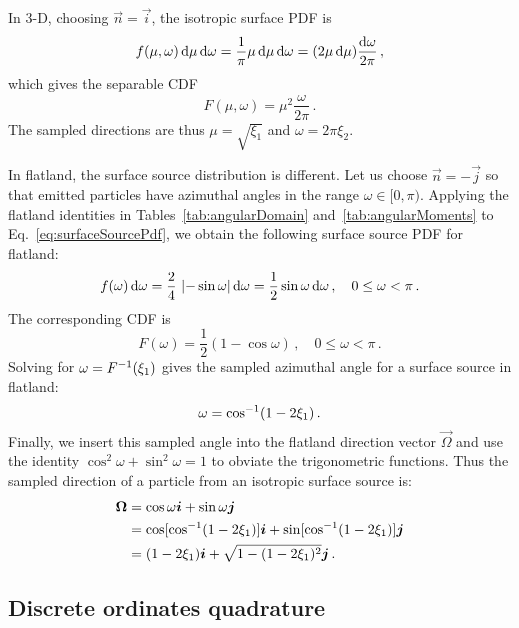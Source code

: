 In 3-D, choosing $\vec{n}=\vec{i}$, the isotropic surface PDF is
\begin{equation*}
  f(\mu,\omega) \mathop{}\!\mathrm{d}\mu \mathop{}\!\mathrm{d}\omega
  = \frac{1}{\pi} \mu \mathop{}\!\mathrm{d}\mu \mathop{}\!\mathrm{d}\omega
  = (2 \mu \mathop{}\!\mathrm{d}\mu) \frac{\mathop{}\!\mathrm{d}\omega}{2\pi}\,,
\end{equation*}
which gives the separable CDF
\begin{equation*}
  F(\mu,\omega) = \mu^2 \frac{\omega}{2\pi}\,.
\end{equation*}
The sampled directions are thus $\mu=\sqrt{\xi_1}$ and $\omega=2\pi \xi_2$.

In flatland, the surface source distribution is different. Let us choose
$\vec{n} = -\vec{j}$ so that emitted particles have azimuthal angles in the range
$\omega \in [0, \pi)$.
Applying the flatland identities in Tables~\ref{tab:angularDomain}
and~\ref{tab:angularMoments} to Eq.~\eqref{eq:surfaceSourcePdf}, we obtain
the following surface source PDF for flatland:
\begin{equation*}
  f(\omega) \mathop{}\!\mathrm{d}\omega = \frac{2}{4} \, \left|  -\sin \omega \right|\mathop{}\!\mathrm{d}\omega
  = \frac{1}{2} \sin \omega\mathop{}\!\mathrm{d}\omega \,,\quad 0 \le \omega < \pi\,.
\end{equation*}
The corresponding CDF is
\begin{equation}\label{eq:surfaceSourceFlatland}
  F(\omega) = \frac{1}{2} \left( 1-\cos\omega \right)
  \,,\quad 0 \le \omega < \pi\,.
\end{equation}
Solving for $\omega = F^{-1}(\xi_1)$ gives the sampled azimuthal angle for a surface source
in flatland:
\begin{equation*}
  \omega = \cos^{-1}(1 - 2\xi_1)\,.
\end{equation*}
Finally, we insert this sampled angle into the flatland
direction vector $\vec{\Omega}$ and use the identity
$\cos^2 \omega + \sin^2 \omega = 1$ to obviate the trigonometric
functions. Thus the sampled direction of a particle from an isotropic surface
source is:
\begin{align*}
  \bm{\Omega} &= \cos \omega \bm{i} + \sin \omega \bm{j} \\
  &=  \cos[ \cos^{-1}(1 - 2\xi_1) ] \bm{i} + \sin[ \cos^{-1}(1 - 2\xi_1) ] \bm{j} \\
  &= (1 - 2\xi_1) \bm{i} + \sqrt{1 - (1 - 2\xi_1)^2} \bm{j}\,.
\end{align*}

\subsection{Discrete ordinates quadrature}\label{sec:flatlandQuadrature}

